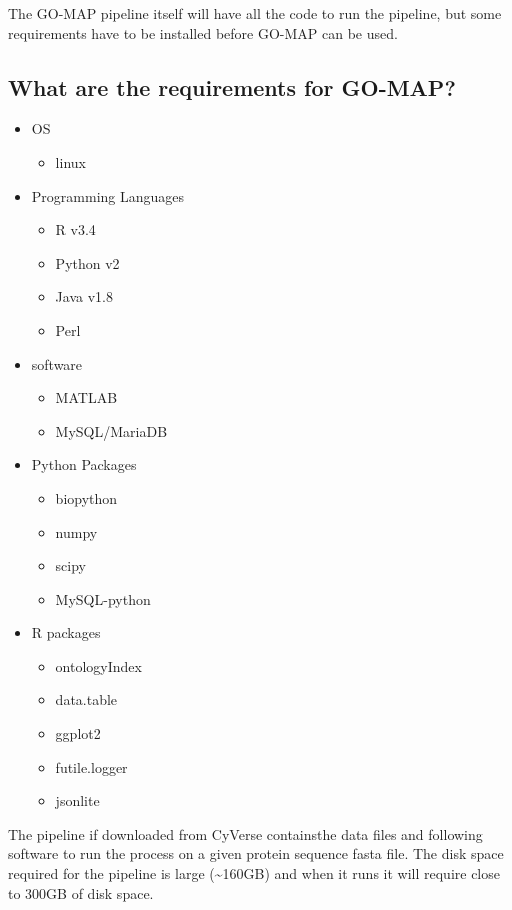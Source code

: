 The GO-MAP pipeline itself will have all the code to run the pipeline, but some requirements have to be installed before GO-MAP can be used. \\[0.3cm]

\subsection{What are the requirements for GO-MAP?}

\begin{itemize}
 \item OS
 \begin{itemize}
     \item linux
 \end{itemize}


 \item Programming Languages
 \begin{itemize}
   \item R v3.4
   \item Python v2
   \item Java v1.8
   \item Perl
 \end{itemize}

 \item software
 \begin{itemize}
   \item MATLAB
   \item MySQL/MariaDB
 \end{itemize}

 \item Python Packages
 \begin{itemize}
  \item biopython
  \item numpy
  \item scipy
  \item MySQL-python
 \end{itemize}

 \item R packages
 \begin{itemize}
  \item ontologyIndex
  \item data.table
  \item ggplot2
  \item futile.logger
  \item jsonlite
 \end{itemize}

\end{itemize}

The pipeline if downloaded from CyVerse containsthe data files and following software to run the process on a given protein sequence fasta file. The disk space required for the pipeline is large (\textasciitilde{}160GB) and when it runs it will require close to 300GB of disk space.
